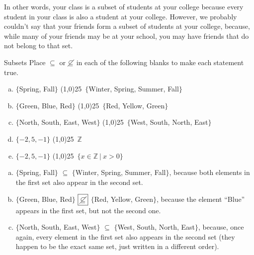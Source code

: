 In other words, your class is a subset of students at your college because every student in your class is also a student at your college.  However, we probably couldn't say that your friends form a subset of students at your college, because, while many of your friends may be at your school, you may have friends that do not belong to that set.
\vfill
\text{}
\vfill
\pagebreak

\begin{example}[https://www.youtube.com/watch?v=5n1TZYFCeYo&list=PLfmpjsIzhztuvrh-T2Owgo_gO84qypSBG&index=5]{Subsets}
Place $\subseteq$ or $\cancel{\subseteq}$ in each of the following blanks to make each statement true.\\

\begin{enumerate}[(a)]
\item $\{$Spring, Fall$\}$ \line(1,0){25}\ $\{$Winter, Spring, Summer, Fall$\}$\\

\item $\{$Green, Blue, Red$\}$ \line(1,0){25}\ $\{$Red, Yellow, Green$\}$\\

\item $\{$North, South, East, West$\}$ \line(1,0){25}\ $\{$West, South, North, East$\}$\\

\item $\{-2,5,-1\}$ \line(1,0){25}\ $\mathbb{Z}$\\

\item $\{-2,5,-1\}$ \line(1,0){25}\ $\{x \in \mathbb{Z}\ |\ x > 0\}$
\end{enumerate}

\sol
\begin{enumerate}[(a)]
\item $\{$Spring, Fall$\}$ $\boxed{\subseteq}$ $\{$Winter, Spring, Summer, Fall$\}$, because both elements in the first set also appear in the second set.\\

\item $\{$Green, Blue, Red$\}$ $\boxed{\cancel{\subseteq}}$ $\{$Red, Yellow, Green$\}$, because the element ``Blue'' appears in the first set, but not the second one.\\

\item $\{$North, South, East, West$\}$ $\boxed{\subseteq}$ $\{$West, South, North, East$\}$, because, once again, every element in the first set also appears in the second set (they happen to be the exact same set, just written in a different order).\\


\end{enumerate}
\end{example}
